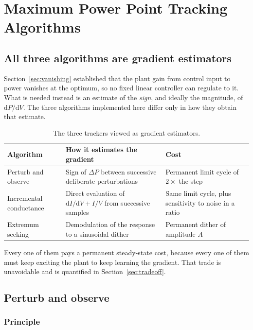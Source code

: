 \chapter{Maximum Power Point Tracking Algorithms}
\label{ch:mppt}

\section{All three algorithms are gradient estimators}

Section~\ref{sec:vanishing} established that the plant gain from control input
to power vanishes at the optimum, so no fixed linear controller can regulate to
it. What is needed instead is an estimate of the \emph{sign}, and ideally the
magnitude, of $\mathrm{d}P/\mathrm{d}V$. The three algorithms implemented here
differ only in how they obtain that estimate.

\begin{table}[htbp]
\centering
\caption{The three trackers viewed as gradient estimators.}
\label{tab:estimators}
\begin{tabular}{@{}L{0.22\textwidth}L{0.40\textwidth}L{0.28\textwidth}@{}}
\toprule
\textbf{Algorithm} & \textbf{How it estimates the gradient} & \textbf{Cost} \\
\midrule
Perturb and observe & Sign of $\Delta P$ between successive deliberate perturbations & Permanent limit cycle of $2\times$ the step \\
Incremental conductance & Direct evaluation of $\mathrm{d}I/\mathrm{d}V + I/V$ from successive samples & Same limit cycle, plus sensitivity to noise in a ratio \\
Extremum seeking & Demodulation of the response to a sinusoidal dither & Permanent dither of amplitude $A$ \\
\bottomrule
\end{tabular}
\end{table}

Every one of them pays a permanent steady-state cost, because every one of them
must keep exciting the plant to keep learning the gradient. That trade is
unavoidable and is quantified in Section~\ref{sec:tradeoff}.

\section{Perturb and observe}

\subsection{Principle}


